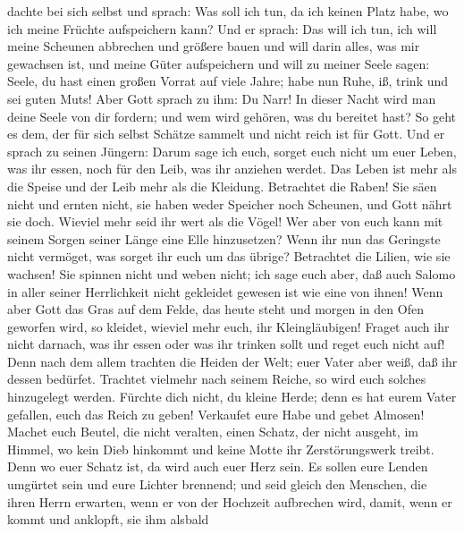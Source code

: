 dachte bei sich selbst und sprach: Was soll ich tun, da ich keinen Platz
habe, wo ich meine Früchte aufspeichern kann?  Und er
sprach: Das will ich tun, ich will meine Scheunen abbrechen und größere
bauen und will darin alles, was mir gewachsen ist, und meine Güter
aufspeichern  und will zu meiner Seele sagen: Seele, du
hast einen großen Vorrat auf viele Jahre; habe nun Ruhe, iß, trink und
sei guten Muts!  Aber Gott sprach zu ihm: Du Narr! In
dieser Nacht wird man deine Seele von dir fordern; und wem wird gehören,
was du bereitet hast?  So geht es dem, der für sich
selbst Schätze sammelt und nicht reich ist für Gott.  Und
er sprach zu seinen Jüngern: Darum sage ich euch, sorget euch nicht um
euer Leben, was ihr essen, noch für den Leib, was ihr anziehen werdet.
 Das Leben ist mehr als die Speise und der Leib mehr als
die Kleidung.  Betrachtet die Raben! Sie säen nicht und
ernten nicht, sie haben weder Speicher noch Scheunen, und Gott nährt sie
doch. Wieviel mehr seid ihr wert als die Vögel!  Wer aber
von euch kann mit seinem Sorgen seiner Länge eine Elle hinzusetzen?
 Wenn ihr nun das Geringste nicht vermöget, was sorget
ihr euch um das übrige?  Betrachtet die Lilien, wie sie
wachsen! Sie spinnen nicht und weben nicht; ich sage euch aber, daß auch
Salomo in aller seiner Herrlichkeit nicht gekleidet gewesen ist wie eine
von ihnen!  Wenn aber Gott das Gras auf dem Felde, das
heute steht und morgen in den Ofen geworfen wird, so kleidet, wieviel
mehr euch, ihr Kleingläubigen!  Fraget auch ihr nicht
darnach, was ihr essen oder was ihr trinken sollt und reget euch nicht
auf!  Denn nach dem allem trachten die Heiden der Welt;
euer Vater aber weiß, daß ihr dessen bedürfet.  Trachtet
vielmehr nach seinem Reiche, so wird euch solches hinzugelegt werden.
 Fürchte dich nicht, du kleine Herde; denn es hat eurem
Vater gefallen, euch das Reich zu geben!  Verkaufet eure
Habe und gebet Almosen! Machet euch Beutel, die nicht veralten, einen
Schatz, der nicht ausgeht, im Himmel, wo kein Dieb hinkommt und keine
Motte ihr Zerstörungswerk treibt.  Denn wo euer Schatz
ist, da wird auch euer Herz sein.  Es sollen eure Lenden
umgürtet sein und eure Lichter brennend;  und seid gleich
den Menschen, die ihren Herrn erwarten, wenn er von der Hochzeit
aufbrechen wird, damit, wenn er kommt und anklopft, sie ihm alsbald
